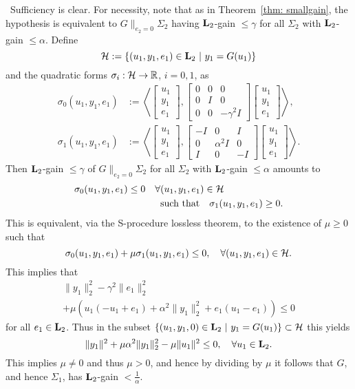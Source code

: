 \documentclass[11pt]{article}
\def\Real{\mathbb{R}} \def\Ints{\mathbb{Z}} \def\Natural{\mathbb{N}}
\newcommand{\Ltwo}{\boldsymbol{\rm L}_{2}}
\begin{document}
 \, Sufficiency is clear.  For necessity, note that as in Theorem~\ref{thm: smallgain}, the hypothesis is equivalent to
$G \|_{e_2=0} \Sigma_2$ having $\Ltwo$-gain $\leq \gamma$ for all $\Sigma_2$ with $\Ltwo$-gain $\leq \alpha$. Define
\[
\HH := \{(u_1, y_1, e_1) \in \Ltwo\ |\ y_1 = G (u_1)\}
\]
and the quadratic forms $\sigma_i : \HH
\to \Real$, $i = 0, 1$, as 
\begin{align*}
 \sigma_0(u_1, y_1, e_1) & := \left\langle 
\begin{bmatrix} 
 u_1 \\
 y_1 \\
 e_1 
\end{bmatrix},
\begin{bmatrix}
0 & 0 & 0  \\
0 & I & 0  \\
0 & 0 & -\gamma^2 I 
\end{bmatrix}
\begin{bmatrix} 
 u_1 \\
 y_1 \\
 e_1 
\end{bmatrix}
\right\rangle ,\\
\sigma_1(u_1, y_1, e_1) & := \left\langle 
\begin{bmatrix} 
 u_1 \\
 y_1 \\
 e_1 
\end{bmatrix},
\begin{bmatrix}
-I & 0 & I  \\
0 & \alpha^2 I & 0  \\
I & 0 & -I 
\end{bmatrix}
\begin{bmatrix} 
 u_1 \\
 y_1 \\
 e_1
\end{bmatrix}
\right\rangle.
\end{align*}
Then $\Ltwo$-gain $\leq \gamma$ of $G \|_{e_2=0} \Sigma_2$ for all $\Sigma_2$ with $\Ltwo$-gain $\leq \alpha$ amounts to
\begin{align*}
 \sigma_0(u_1, y_1, e_1) \leq 0 \quad \forall & (u_1, y_1, e_1) \in \mathcal{H} \\
 & \text{such that} \quad \sigma_1(u_1, y_1, e_1) \geq 0.
\end{align*}
This is equivalent, via the S-procedure lossless theorem, to the existence of $\mu \geq 0$ such that
\[
 \sigma_0(u_1, y_1, e_1) + \mu \sigma_1(u_1, y_1, e_1) \leq 0, \quad \forall (u_1, y_1, e_1) \in \mathcal{H}.
\]
This implies that
\[
\begin{array}{l}
\| y_1 \|_2^2 - \gamma^2  \|e_1\|_2^2  \\[2mm]
+ \mu \left(u_1(-u_1 + e_1)+  \alpha^2 \|y_1\|_2^2 + e_1(u_1 -e_1) \right) \leq 0
\end{array}
\]
for all $e_1 \in \Ltwo$. Thus in the subset $\{(u_1, y_1, 0) \in \Ltwo\ |\ y_1 = G (u_1) \} \subset \HH$ this yields
\[
\|y_1\|^2 + \mu \alpha^2 \| y_1 \|_2^2 - \mu \|u_1\|^2 \leq 0, \quad  \forall u_1 \in \Ltwo.
\]
This implies $\mu \neq 0$ and thus $\mu >0$, and hence by dividing by $\mu$ it follows that $G$, and hence $\Sigma_1$, has $\Ltwo$-gain $< \frac{1}{\alpha}$. %
\end{document}
